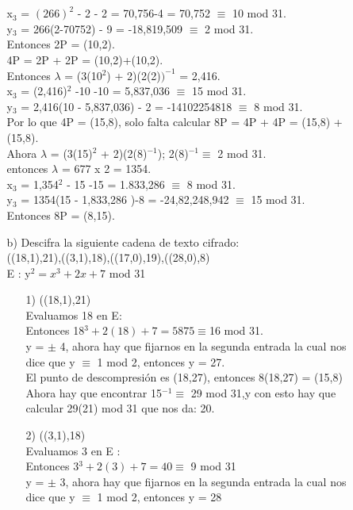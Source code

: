 \documentclass[10pt,a4paper]{article}
\begin{document}
\begin{enumerate}
\begin{itemize}
\\
\\x$_{3}$ = $(266)^{2}$ - 2 - 2 = 70,756-4 = 70,752 $\equiv$ 10 mod 31.
\\y$_{3}$ = 266(2-70752) - 9 = -18,819,509 $\equiv$  2 mod 31.\\
Entonces 2P = (10,2).\\
4P = 2P + 2P =  (10,2)+(10,2).\\
Entonces $\lambda$ = (3(10$^{2}$) + 2)(2(2)$)^{-1}$ = 2,416.\\
x$_{3}$ = (2,416)$^{2}$ -10 -10 = 5,837,036 $\equiv$ 15 mod 31.\\
y$_{3}$ = 2,416(10 - 5,837,036) - 2 = -14102254818 $\equiv$ 8 mod 31.\\
Por lo que 4P = (15,8), solo falta calcular 8P = 4P + 4P = (15,8) + (15,8).\\
Ahora $\lambda$ = (3(15)$^{2}$ + 2)(2(8)$^{-1}$); 2(8)$^{-1} \equiv $ 2 mod 31. \\
entonces $\lambda$ = 677 x 2 = 1354.\\
x$_{3}$ = 1,354$^{2}$ - 15 -15 = 1.833,286 $\equiv$ 8 mod 31.\\
y$_{3}$ = 1354(15 - 1,833,286 )-8 = -24,82,248,942 $\equiv$ 15 mod 31.\\
Entonces 8P = (8,15).
\item[b)] Descifra la siguiente cadena de texto cifrado: \\
((18,1),21),((3,1),18),((17,0),19),((28,0),8)\\
E : y$^{2} = x^{3} + 2x + 7$ mod 31
\begin{itemize}
\item[1)] ((18,1),21)\\
Evaluamos 18 en E:\\
Entonces 18$^{3} +2(18) + 7 = 5875 \equiv $16 mod 31.\\
y = $\pm$ 4, ahora hay que fijarnos en la segunda entrada la cual nos dice que y $\equiv$ 1 mod 2, entonces y = 27.\\
El punto de descompresión es (18,27), entonces 8(18,27) = (15,8)\\
Ahora hay que encontrar 15$^{-1} \equiv $ 29 mod 31,y con esto hay que calcular 29(21) mod 31 que nos da: 20.
\item[2)] ((3,1),18)\\
Evaluamos 3 en E :\\
Entonces 3$^{3} + 2(3) + 7 = 40 \equiv $ 9 mod 31\\
y = $\pm$ 3, ahora hay que fijarnos en la segunda entrada la cual nos dice que y $\equiv$ 1 mod 2, entonces y = 28 \\ 

\end{itemize}
\end{itemize}
\end{enumerate}
\end{document}
